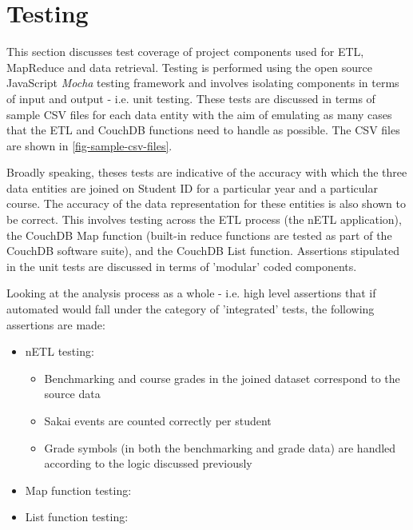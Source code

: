 \section{Testing}
This section discusses test coverage of project components used for ETL, MapReduce and data retrieval. Testing is performed using the open source JavaScript \textit{Mocha} testing framework \cite{mochaTest} and involves isolating components in terms of input and output - i.e. unit testing. These tests are discussed in terms of sample CSV files for each data entity with the aim of emulating as many cases that the ETL and CouchDB functions need to handle as possible. The CSV files are shown in \ref{fig-sample-csv-files}.

Broadly speaking, theses tests are indicative of the accuracy with which the three data entities are joined on Student ID for a particular year and a particular course. The accuracy of the data representation for these entities is also shown to be correct. This involves testing across the ETL process (the nETL application), the CouchDB Map function (built-in reduce functions are tested as part of the CouchDB software suite), and the CouchDB List function. Assertions stipulated in the unit tests are discussed in terms of 'modular' coded components.

Looking at the analysis process as a whole - i.e. high level assertions that if automated would fall under the category of 'integrated' tests, the following assertions are made:

\begin{itemize}
    \item nETL testing:
          \begin{itemize}
              \item Benchmarking and course grades in the joined dataset correspond to the source data
              \item Sakai events are counted correctly per student
              \item Grade symbols (in both the benchmarking and grade data) are handled according to the logic discussed previously
          \end{itemize}
    \item Map function testing:
          \begin{itemize}
          \end{itemize}
    \item List function testing:
          \begin{itemize}
          \end{itemize}
\end{itemize}

